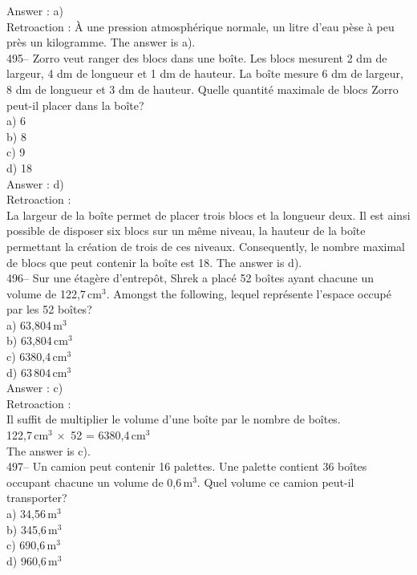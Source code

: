 ﻿\documentclass[letterpaper, 12pt]{article}
\begin{document}
Answer : a)\\

Retroaction :
\`A une pression atmosph\'erique normale, un litre d'eau p\`ese \`a peu
pr\`es un kilogramme.  The answer is a).\\

495-- Zorro veut ranger des blocs dans une bo\^ite.  Les blocs mesurent 2 dm
de largeur, 4 dm de longueur et 1 dm de hauteur.  La bo\^ite mesure 6 dm de
largeur, 8 dm de longueur et 3 dm de hauteur.  Quelle quantit\'e maximale de
blocs Zorro peut-il placer dans la bo\^ite?\\
a) 6\\
b) 8\\
c) 9\\
d) 18\\

Answer : d)\\

Retroaction : \\
La largeur de la bo\^ite permet de placer trois blocs et la longueur
deux. Il est ainsi possible de disposer six blocs sur un m\^eme
niveau, la hauteur de la bo\^ite permettant la cr\'eation de trois
de ces niveaux. Consequently, le nombre maximal de blocs que
peut contenir la bo\^ite est
18.  The answer is d).\\

496-- Sur une \'etag\`ere d'entrep\^ot, Shrek a plac\'e 52 bo\^ites ayant
chacune un volume de 122,7\,cm$^{3}$.  Amongst the following,
lequel repr\'esente l'espace occup\'e par les 52 bo\^ites? \\
a) 63,804\,m$^{3}$\\
b) 63,804\,cm$^{3}$\\
c) 6380,4\,cm$^{3}$\\
d) $63\,804$\,cm$^{3}$\\

Answer : c)\\

Retroaction : \\
Il suffit de multiplier le volume d'une bo\^ite par le nombre de bo\^ites.
\\
122,7\,cm$^{3}\,\times$ 52 = 6380,4\,cm$^{3}$\\
The answer is c).\\

497--  Un camion peut contenir 16 palettes.  Une palette contient 36
bo\^ites occupant chacune un volume de 0,6\,m$^{3}$.  Quel volume ce camion
peut-il transporter?\\
a) 34,56\,m$^{3}$\\
b) 345,6\,m$^{3}$\\
c) 690,6\,m$^{3}$\\
d) 960,6\,m$^{3}$\\
\end{document}
